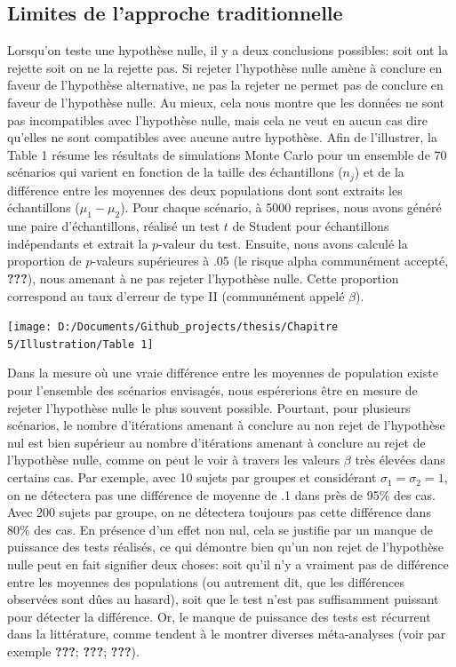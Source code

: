 \documentclass[
  english,
  man]{apa6}
\begin{document}
\hypertarget{limites-de-lapproche-traditionnelle}{%
\subsection{Limites de l'approche traditionnelle}\label{limites-de-lapproche-traditionnelle}}

Lorsqu'on teste une hypothèse nulle, il y a deux conclusions possibles: soit ont la rejette soit on ne la rejette pas. Si rejeter l'hypothèse nulle amène à conclure en faveur de l'hypothèse alternative, ne pas la rejeter ne permet pas de conclure en faveur de l'hypothèse nulle. Au mieux, cela nous montre que les données ne sont pas incompatibles avec l'hypothèse nulle, mais cela ne veut en aucun cas dire qu'elles ne sont compatibles avec aucune autre hypothèse. Afin de l'illustrer, la Table 1 résume les résultats de simulations Monte Carlo pour un ensemble de 70 scénarios qui varient en fonction de la taille des échantillons (\(n_j\)) et de la différence entre les moyennes des deux populations dont sont extraits les échantillons (\(\mu_1-\mu_2\)). Pour chaque scénario, à 5000 reprises, nous avons généré une paire d'échantillons, réalisé un test \(t\) de Student pour échantillons indépendants et extrait la \(p\)-valeur du test. Ensuite, nous avons calculé la proportion de \(p\)-valeurs supérieures à .05 (le risque alpha communément accepté, {\textbf{???}}), nous amenant à ne pas rejeter l'hypothèse nulle. Cette proportion correspond au taux d'erreur de type II (communément appelé \(\beta\)).

\begin{center}\texttt{[image: D:/Documents/Github\_projects/thesis/Chapitre 5/Illustration/Table 1]} \end{center}

Dans la mesure où une vraie différence entre les moyennes de population existe pour l'ensemble des scénarios envisagés, nous espérerions être en mesure de rejeter l'hypothèse nulle le plus souvent possible. Pourtant, pour plusieurs scénarios, le nombre d'itérations amenant à conclure au non rejet de l'hypothèse nul est bien supérieur au nombre d'itérations amenant à conclure au rejet de l'hypothèse nulle, comme on peut le voir à travers les valeurs \(\beta\) très élevées dans certains cas. Par exemple, avec 10 sujets par groupes et considérant \(\sigma_1=\sigma_2=1\), on ne détectera pas une différence de moyenne de .1 dans près de 95\% des cas. Avec 200 sujets par groupe, on ne détectera toujours pas cette différence dans 80\% des cas. En présence d'un effet non nul, cela se justifie par un manque de puissance des tests réalisés, ce qui démontre bien qu'un non rejet de l'hypothèse nulle peut en fait signifier deux choses: soit qu'il n'y a vraiment pas de différence entre les moyennes des populations (ou autrement dit, que les différences observées sont dûes au hasard), soit que le test n'est pas suffisamment puissant pour détecter la différence. Or, le manque de puissance des tests est récurrent dans la littérature, comme tendent à le montrer diverses méta-analyses (voir par exemple {\textbf{???}}; {\textbf{???}}; {\textbf{???}}).
\end{document}

